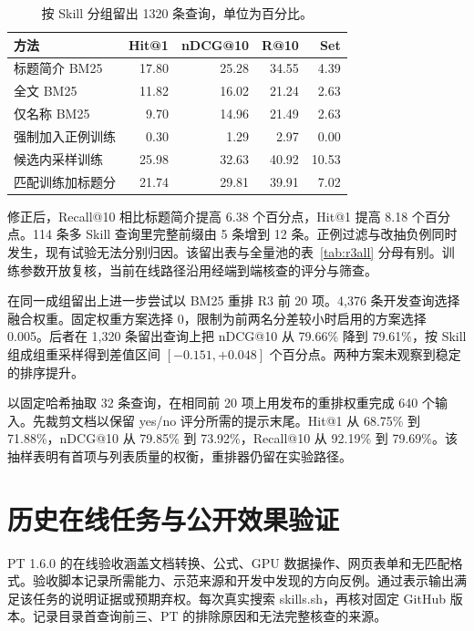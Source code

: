 \documentclass[final,5p,twocolumn,10pt]{elsarticle}
\begin{document}
\begin{table}[!ht]
\centering\small
\caption{按 Skill 分组留出 1320 条查询，单位为百分比。}
\label{tab:ranker}
\begin{tabularx}{\columnwidth}{@{}Xrrrr@{}}
\toprule
方法 & Hit@1 & nDCG@10 & R@10 & Set \\
\midrule
标题简介 BM25 & 17.80 & 25.28 & 34.55 & 4.39 \\
全文 BM25 & 11.82 & 16.02 & 21.24 & 2.63 \\
仅名称 BM25 & 9.70 & 14.96 & 21.49 & 2.63 \\
强制加入正例训练 & 0.30 & 1.29 & 2.97 & 0.00 \\
候选内采样训练 & 25.98 & 32.63 & 40.92 & 10.53 \\
匹配训练加标题分 & 21.74 & 29.81 & 39.91 & 7.02 \\
\bottomrule
\end{tabularx}
\end{table}

修正后，Recall@10 相比标题简介提高 6.38 个百分点，Hit@1 提高 8.18 个百分点。114 条多 Skill 查询里完整前缀由 5 条增到 12 条。正例过滤与改抽负例同时发生，现有试验无法分别归因。该留出表与全量池的表~\ref{tab:r3all} 分母有别。训练参数开放复核，当前在线路径沿用经端到端核查的评分与筛查。

在同一成组留出上进一步尝试以 BM25 重排 R3 前 20 项。4,376 条开发查询选择融合权重。固定权重方案选择 0，限制为前两名分差较小时启用的方案选择 0.005。后者在 1,320 条留出查询上把 nDCG@10 从 79.66\% 降到 79.61\%，按 Skill 组成组重采样得到差值区间 $[-0.151,+0.048]$ 个百分点。两种方案未观察到稳定的排序提升。

以固定哈希抽取 32 条查询，在相同前 20 项上用发布的重排权重完成 640 个输入。先裁剪文档以保留 yes/no 评分所需的提示末尾。Hit@1 从 68.75\% 到 71.88\%，nDCG@10 从 79.85\% 到 73.92\%，Recall@10 从 92.19\% 到 79.69\%。该抽样表明有首项与列表质量的权衡，重排器仍留在实验路径。

\section{历史在线任务与公开效果验证}

PT 1.6.0 的在线验收涵盖文档转换、公式、GPU 数据操作、网页表单和无匹配格式。验收脚本记录所需能力、示范来源和开发中发现的方向反例。通过表示输出满足该任务的说明证据或预期弃权。每次真实搜索 skills.sh，再核对固定 GitHub 版本。记录目录首查询前三、PT 的排除原因和无法完整核查的来源。
\end{document}
